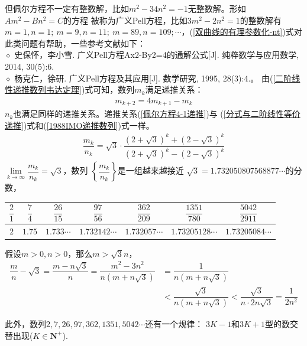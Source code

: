 \begin{enumerate}[label={【\textbf{例\thechapter.\arabic*}】},
 leftmargin=\inteval{\myenumleftmargin}pt,
 itemsep=\inteval{\myenumitempsep}pt,
 itemindent=\inteval{\myenumitemindent}pt]
{但佩尔方程不一定有整数解，比如$ m^2-34n^2=-1 $无整数解。形如$ Am^2-Bn^2=C $的方程
被称为广义Pell方程，比如$ 3m^2-2n^2=1 $的整数解有$ m=1,n=1;\ m=9,n=11;\ m=89,n=109;\cdots $，(\ref{双曲线的有理参数化-nt})式对此类问题有帮助，一些参考文献如下：\\
$ \diamond $ 史保怀，李小雪. 广义Pell方程Ax2-By2=4的通解公式[J]. 纯粹数学与应用数学, 2014, 30(5):6.\\
$ \diamond $ 杨克仁，徐研. 广义Pell方程及其应用[J]. 数学研究, 1995, 28(3):4.}。
由(\ref{二阶线性递推数列韦达定理})式可知，数列$ m_k $满足递推关系：
\begin{align}\label{佩尔方程4-1递推}
    m_{k+2}=4m_{k+1}-m_k
\end{align}
$ n_k $也满足同样的递推关系。递推关系(\ref{佩尔方程4-1递推})与
(\ref{分式与二阶线性等价递推})式和(\ref{1988IMO递推数列})式一样。
\begin{gather*}
    \dfrac{m_k}{n_k}=\sqrt{3}\cdot \dfrac{(2+\sqrt{3})^k+
        (2-\sqrt{3})^k}{(2+\sqrt{3})^k-(2-\sqrt{3})^k}
\end{gather*}
$ \lim\limits_{k\to\infty} \dfrac{m_k}{n_k}=\sqrt{3} $，数列
$ \left\{\dfrac{m_k}{n_k}\right\} $是一组越来越接近
$ \sqrt{3}=1.732050807568877\cdots $的分数，
{ %
\renewcommand{\arraystretch}{1.6}    
\begin{table}[!h]
\centering
\begin{tabular}{|c|c|c|c|c|c|c|}
    \hline
    $ \dfrac{2}{1} $ & $ \dfrac{7}{4} $ & $ \dfrac{26}{15} $ & 
    $ \dfrac{97}{56} $ & $ \dfrac{362}{209} $ & $ \dfrac{1351}{780} $ 
    & $ \dfrac{5042}{2911} $  \\  \hline
    $ 2 $ & $ 1.75 $ & $ 1.733\cdots $ & $ 1.732142\cdots $ 
    & $ 1.732057\cdots $ & $ 1.73205128\cdots $ & $ 1.73205084\cdots $ 
    \\    \hline
\end{tabular}
\end{table}    }

假设$ m>0,n>0 $，那么$ m>\sqrt{3}n $，
\begin{align*}
    \dfrac{m}{n}-\sqrt{3}=\dfrac{m-n\sqrt{3}}{n}=
    \dfrac{m^2-3n^2}{n(m+n\sqrt{3})}& =\dfrac{1}{n(m+n\sqrt{3})} \\
    & <\dfrac{\sqrt{3}}{n(m+n\sqrt{3})}<
    \dfrac{\sqrt{3}}{n\cdot 2n\sqrt{3}}=\dfrac{1}{2n^2}
\end{align*}

此外，数列$ 2,7,26,97,362,1351,5042\cdots $还有一个规律：
$ 3K-1 $和$ 3K+1 $型的数交替出现($ K\in \textbf{N}^+ $).


\end{enumerate}
